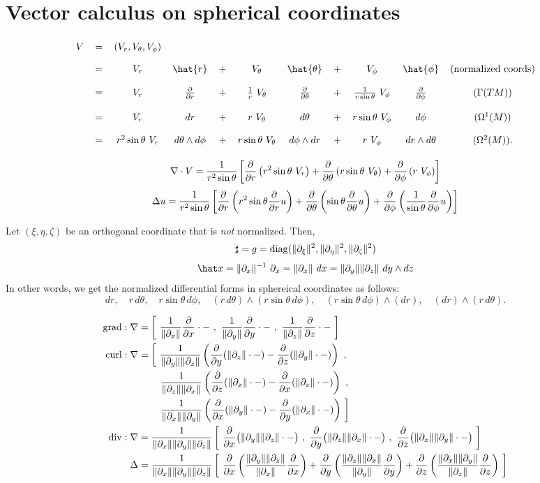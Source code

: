 \documentclass[12pt]{article}
\begin{document}
\section{Vector calculus on spherical coordinates}
\[
\begin{tikzcd}[row sep=5pt, column sep=3pt]
V&=&(V_r,V_\theta,V_\phi)&&&&&&&&\\
&=&V_r&\hat{r}&+&V_\theta&\hat{\theta}&+&V_\phi&\hat{\phi}&(\text{normalized coords})\\
&=&V_r&\pd{r}&+&\frac1r\ V_\theta&\pd{\theta}&+&\frac1{r\sin\theta}\ V_\phi&\pd{\phi}&(\Gamma(TM))\\
&=&V_r&dr&+&r\ V_\theta&d\theta&+&r\sin\theta\ V_\phi&d\phi&(\Omega^1(M))\\
&=&r^2\sin\theta\ V_r&d\theta\wedge d\phi&+&r\sin\theta\ V_\theta&d\phi\wedge dr&+&r\ V_\phi&dr\wedge d\theta&(\Omega^2(M)).
\end{tikzcd}
\]

\[
\nabla\cdot V=\frac1{r^2\sin\theta}\left[  \pd{r}\left(r^2\sin\theta\ V_r\right) + \pd{\theta}\left(r\sin\theta\ V_\theta\right) + \pd{\phi}\left(r\ V_\phi\right)  \right]
\]
\[\Delta u=\frac1{r^2\sin\theta}\left[\pd{r}\left(r^2\sin\theta\pd{r}u\right)+\pd{\theta}\left(\sin\theta\pd{\theta}u\right)+\pd{\phi}\left(\frac1{\sin\theta}\pd{\phi}u\right)\right]\]

Let $(\xi,\eta,\zeta)$ be an orthogonal coordinate that is \emph{not} normalized.
Then,
\[\sharp=g=\diag(\|\pd_\xi\|^2,\|\pd_\eta\|^2,\|\pd_\zeta\|^2)\]
\[\hat x=\|\pd_x\|^{-1}\ \pd_x=\|\pd_x\|\ dx=\|\pd_y\|\|\pd_z\|\ dy\wedge dz\]
In other words, we get the normalized differential forms in sphereical coordinates as follows:
\[dr,\quad r\,d\theta,\quad r\sin\theta\,d\phi,\quad(r\,d\theta)\wedge(r\sin\theta\,d\phi),\quad(r\sin\theta\,d\phi)\wedge(dr),\quad(dr)\wedge(r\,d\theta).\]

\begin{align*}
\grad:\nabla&=\left[\ \frac1{\|\pd_x\|}\pd{x}\cdot-\ ,\ \frac1{\|\pd_y\|}\pd{y}\cdot-\ ,\ \frac1{\|\pd_z\|}\pd{z}\cdot-\ \right]\\
\curl:\nabla&=\left[\ \frac1{\|\pd_y\|\|\pd_z\|}\left(\pd{y}(\|\pd_z\|\cdot-)-\pd{z}(\|\pd_y\|\cdot-)\right)\ ,\right.\\
&\qquad\left.\frac1{\|\pd_z\|\|\pd_x\|}\left(\pd{z}(\|\pd_x\|\cdot-)-\pd{x}(\|\pd_z\|\cdot-)\right)\ ,\right.\\
&\qquad\left.\frac1{\|\pd_x\|\|\pd_y\|}\left(\pd{x}(\|\pd_y\|\cdot-)-\pd{y}(\|\pd_x\|\cdot-)\right)\ \right]\\
\div:\nabla&=\frac1{\|\pd_x\|\|\pd_y\|\|\pd_z\|}\left[\ \pd{x}\bigl(\|\pd_y\|\|\pd_z\|\cdot-\bigr)\ ,\ \pd{y}\bigl(\|\pd_z\|\|\pd_x\|\cdot-\bigr)\ ,\ \pd{z}\bigl(\|\pd_x\|\|\pd_y\|\cdot-\bigr)\ \right]\\
\Delta&=\frac1{\|\pd_x\|\|\pd_y\|\|\pd_z\|}\left[\ \pd{x}\left(\frac{\|\pd_y\|\|\pd_z\|}{\|\pd_x\|}\pd{x}\right)+\pd{y}\left(\frac{\|\pd_z\|\|\pd_x\|}{\|\pd_y\|}\pd{y}\right)+\pd{z}\left(\frac{\|\pd_x\|\|\pd_y\|}{\|\pd_z\|}\pd{z}\right)\ \right]
\end{align*}
\end{document}
